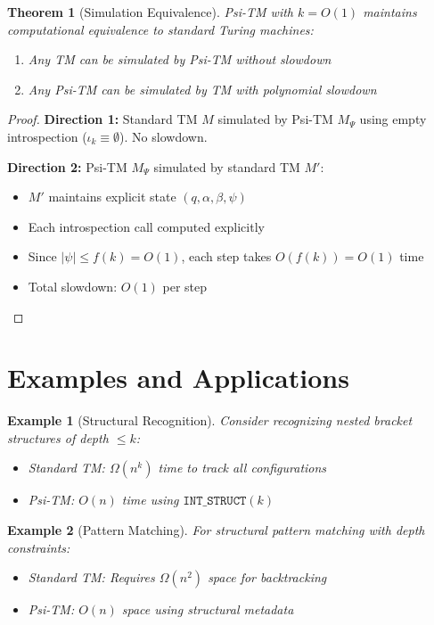 \documentclass[11pt]{article}
\newtheorem{theorem}{Theorem}
\newtheorem{example}{Example}
\begin{document}
\begin{theorem}[Simulation Equivalence]
\label{thm:equivalence}
Psi-TM with $k = O(1)$ maintains computational equivalence to standard Turing machines:
\begin{enumerate}
\item Any TM can be simulated by Psi-TM without slowdown
\item Any Psi-TM can be simulated by TM with polynomial slowdown
\end{enumerate}
\end{theorem}

\begin{proof}
\textbf{Direction 1:} Standard TM $M$ simulated by Psi-TM $M_\Psi$ using empty introspection ($\iota_k \equiv \emptyset$). No slowdown.

\textbf{Direction 2:} Psi-TM $M_\Psi$ simulated by standard TM $M'$:
\begin{itemize}
\item $M'$ maintains explicit state $(q, \alpha, \beta, \psi)$ 
\item Each introspection call computed explicitly
\item Since $|\psi| \leq f(k) = O(1)$, each step takes $O(f(k)) = O(1)$ time
\item Total slowdown: $O(1)$ per step
\end{itemize}
\end{proof}

\section{Examples and Applications}

\begin{example}[Structural Recognition]
Consider recognizing nested bracket structures of depth $\leq k$:
\begin{itemize}
\item Standard TM: $\Omega(n^k)$ time to track all configurations
\item Psi-TM: $O(n)$ time using $\texttt{INT\_STRUCT}(k)$
\end{itemize}
\end{example}

\begin{example}[Pattern Matching]
For structural pattern matching with depth constraints:
\begin{itemize}
\item Standard TM: Requires $\Omega(n^2)$ space for backtracking
\item Psi-TM: $O(n)$ space using structural metadata
\end{itemize}
\end{example}
\end{document}
